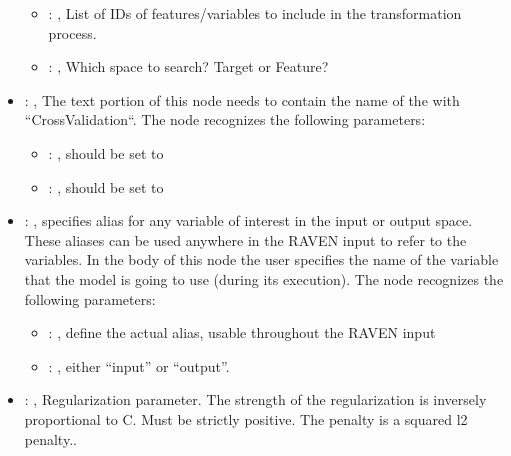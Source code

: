 \begin{itemize}
\begin{itemize}
        \item {}: , 
          List of IDs of features/variables to include in the transformation process.

        \item {}: , 
          Which space to search? Target or Feature?
      \end{itemize}

    \item {}: , 
      The text portion of this node needs to contain the name of the  with
               ``CrossValidation``.
      The  node recognizes the following parameters:
        \begin{itemize}
          \item {}: , 
            should be set to 
          \item {}: , 
            should be set to 
      \end{itemize}

    \item {}: , 
      specifies alias for         any variable of interest in the input or output space. These
      aliases can be used anywhere in the RAVEN input to         refer to the variables. In the body
      of this node the user specifies the name of the variable that the model is going to use
      (during its execution).
      The  node recognizes the following parameters:
        \begin{itemize}
          \item {}: , 
            define the actual alias, usable throughout the RAVEN input
          \item {}: , 
            either ``input'' or ``output''.
      \end{itemize}

    \item {}: , 
      Regularization parameter. The strength of the regularization is inversely
      proportional to C.                                                            Must be strictly
      positive. The penalty is a squared l2 penalty..


\end{itemize}
